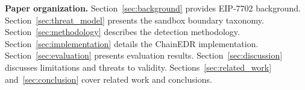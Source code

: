 \textbf{Paper organization.} Section~\ref{sec:background} provides EIP-7702 background. Section~\ref{sec:threat_model} presents the sandbox boundary taxonomy. Section~\ref{sec:methodology} describes the detection methodology. Section~\ref{sec:implementation} details the ChainEDR implementation. Section~\ref{sec:evaluation} presents evaluation results. Section~\ref{sec:discussion} discusses limitations and threats to validity. Sections~\ref{sec:related_work} and~\ref{sec:conclusion} cover related work and conclusions.

